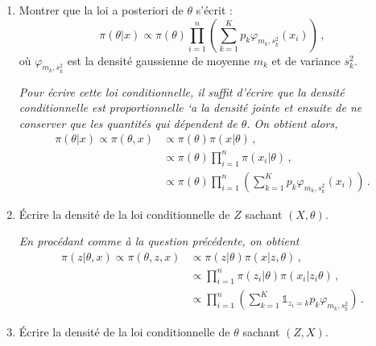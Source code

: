 \documentclass[a4paper,10pt,fleqn]{article}
\newcommand{\1}{\ensuremath{\mathbbm{1}}}
\begin{document}
\begin{enumerate}
\item Montrer que la loi a posteriori de $\theta$ s'\'ecrit :
$$
\pi(\theta|x) \propto \pi(\theta)\prod_{i=1}^n\left(\sum_{k=1}^Kp_k \varphi_{m_k,s_k^2}(x_i)\right)\,,
$$
o\`u $\varphi_{m_k,s_k^2}$ est la densit\'e gaussienne de moyenne $m_k$ et de variance $s_k^2$.

\vspace{.2cm}

{\em
Pour \'ecrire cette loi conditionnelle, il suffit d'\'ecrire que la densit\'e conditionnelle est proportionnelle `a la densit\'e jointe et ensuite de ne conserver que les quantit\'es qui d\'ependent de $\theta$. On obtient alors,
\begin{align*}
\pi(\theta|x)\propto \pi(\theta,x) &\propto \pi(\theta) \pi(x|\theta)\,,\\
&\propto \pi(\theta) \prod_{i=1}^n\pi(x_i|\theta)\,,\\
&\propto \pi(\theta) \prod_{i=1}^n\left(\sum_{k=1}^Kp_k\varphi_{m_k,s_k^2}(x_i)\right)\,.
\end{align*}
}
\item \'Ecrire la densit\'e de la loi conditionnelle de $Z$ sachant $(X,\theta)$.

\vspace{.2cm}

{\em
En proc\'edant comme \`a la question pr\'ec\'edente, on obtient
\begin{align*}
\pi(z|\theta,x)\propto \pi(\theta,z,x) &\propto \pi(z|\theta) \pi(x|z,\theta)\,,\\
&\propto \prod_{i=1}^n\pi(z_i|\theta)\pi(x_i|z_i\theta)\,,\\
&\propto \prod_{i=1}^n\left(\sum_{k=1}^K\mathds{1}_{z_i=k}p_k\varphi_{m_k,s_k^2}\right)\,.
\end{align*}
}
\item \'Ecrire la densit\'e de la loi conditionnelle de $\theta$ sachant $(Z,X)$.

\vspace{.2cm}


\end{enumerate}
\end{document}
